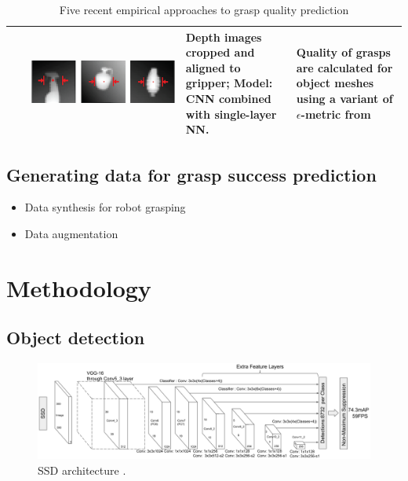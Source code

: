 \documentclass[runningheads]{../llncs}
\begin{document}
\begin{table}[h!]
\begin{tabularx}{\linewidth}{L{0.05\linewidth}C{0.39\linewidth}L{0.28\linewidth}L{0.28\linewidth}}
        \cite{mahler2017}   & \includegraphics[scale=0.22,valign=t]{mahler_et_al-2017-grasp_representation}
            & Depth images cropped and aligned to gripper; \linebreak Model: CNN combined with single-layer NN.
            & Quality of grasps are \linebreak calculated for object \linebreak meshes using a variant of
            $ \epsilon $-metric from \cite{WeiszAllen2012} \\
        \bottomrule
    \end{tabularx}
    \caption{\small Five recent empirical approaches to grasp quality prediction}
    \label{table:grasp_approaches}
\end{table}

\subsection{Generating data for grasp success prediction}
\begin{itemize}
    \item Data synthesis for robot grasping
    \item Data augmentation
\end{itemize}

\section{Methodology}

\subsection{Object detection}

\begin{figure}[h!]
    \centering
    \includegraphics[width=\textwidth]{liu_et_al-2016-ssd_arch}
    \caption{SSD architecture \cite{Liu2016SSD}.}
    \label{fig:ssd_arch}
\end{figure}
\end{document}
